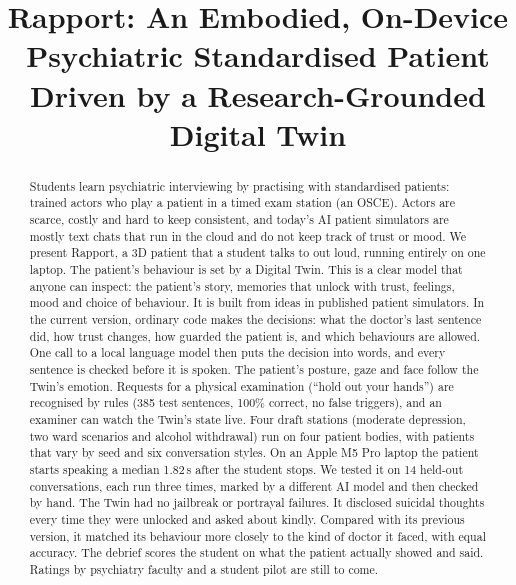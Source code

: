 \documentclass[conference]{IEEEtran}
\begin{document}
\title{Rapport: An Embodied, On-Device Psychiatric Standardised Patient Driven by a Research-Grounded Digital Twin}

\author{
}

\maketitle

\begin{abstract}
Students learn psychiatric interviewing by practising with standardised patients: trained actors who play a patient in a timed exam station
(an OSCE). Actors are scarce, costly and hard to keep consistent, and today's AI patient simulators are mostly text chats that run in the cloud
and do not keep track of trust or mood. We present Rapport, a 3D patient that a student talks to out loud, running entirely on one laptop. The patient's behaviour is set by a Digital Twin. This is a clear model that anyone can inspect: the patient's story, memories that unlock with trust, feelings, mood and choice of behaviour. It is built from ideas in published patient simulators. In the current version, ordinary code makes the decisions: what the doctor's last sentence did, how trust changes, how guarded the patient is, and which behaviours are allowed. One call to a local language model then puts the decision into words, and every sentence is checked before it is spoken. The patient's posture, gaze and face follow the Twin's emotion.
Requests for a physical examination (``hold out your hands'') are recognised by rules (385 test sentences, 100\% correct, no false triggers), and
an examiner can watch the Twin's state live. Four draft stations (moderate depression, two ward scenarios and alcohol withdrawal) run on four patient
bodies, with patients that vary by seed and six conversation styles. On an Apple M5 Pro laptop the patient starts speaking a median 1.82\,s after the
student stops. We tested it on 14 held-out conversations, each run three times, marked by a different AI model and then checked by hand. The Twin had no jailbreak or portrayal failures. It disclosed suicidal thoughts every time they were unlocked and asked about kindly. Compared with its previous version, it matched its behaviour more closely to the kind of doctor it faced, with equal accuracy. The debrief scores the student on what the patient actually showed and said. Ratings by psychiatry faculty
and a student pilot are still to come.
\end{abstract}
\end{document}
